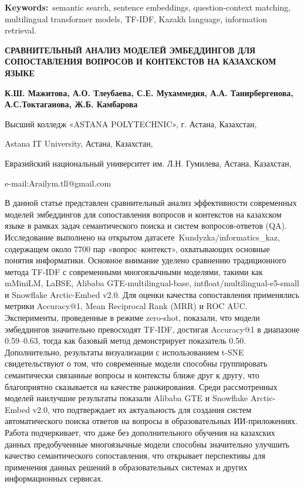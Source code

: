 {\bfseries Keywords:}~semantic search, sentence embeddings,
question-context matching, multilingual transformer models, TF-IDF,
Kazakh language, information retrieval.

\begin{header}
{\bfseries СРАВНИТЕЛЬНЫЙ АНАЛИЗ МОДЕЛЕЙ ЭМБЕДДИНГОВ ДЛЯ СОПОСТАВЛЕНИЯ ВОПРОСОВ И КОНТЕКСТОВ НА КАЗАХСКОМ ЯЗЫКЕ}

{\bfseries
{}К.Ш. Мажитова\envelope,
А.О. Тлеубаева,
С.Е. Мухаммедия,
А.А. Танирбергенова,
А.С.Токтаганова,
Ж.Б. Камбарова
}
\end{header}

\begin{affil}
Высший колледж «ASTANA POLYTECHNIC», г. Астана, Казахстан,

Astana IT University, Астана, Казахстан,

Евразийский национальный университет им. Л.Н. Гумилева, Астана, Казахстан,

e-mail:Arailym.tll@gmail.com
\end{affil}

В данной статье представлен сравнительный анализ эффективности
современных моделей эмбеддингов для сопоставления вопросов и контекстов
на казахском языке в рамках задач семантического поиска и систем
вопросов-ответов (QA). Исследование выполнено на открытом
датасете~Kundyzka/informatics\_kaz, содержащем около 7700 пар
«вопрос--контекст», охватывающих основные понятия информатики. Основное
внимание уделено сравнению традиционного метода TF-IDF с современными
многоязычными моделями, такими как mMiniLM, LaBSE, Alibaba
GTE-multilingual-base, intfloat/multilingual-e5-small и Snowflake
Arctic-Embed v2.0. Для оценки качества сопоставления применялись метрики
Accuracy@1, Mean Reciprocal Rank (MRR) и ROC AUC. Эксперименты,
проведенные в режиме zero-shot, показали, что модели эмбеддингов
значительно превосходят TF-IDF, достигая Accuracy@1 в диапазоне
0.59--0.63, тогда как базовый метод демонстрирует показатель 0.50.
Дополнительно, результаты визуализации с использованием t-SNE
свидетельствуют о том, что современные модели способны группировать
семантически связанные вопросы и контексты ближе друг к другу, что
благоприятно сказывается на качестве ранжирования. Среди рассмотренных
моделей наилучшие результаты показали Alibaba GTE и Snowflake
Arctic-Embed v2.0, что подтверждает их актуальность для создания систем
автоматического поиска ответов на вопросы в образовательных
ИИ-приложениях. Работа подчеркивает, что даже без дополнительного
обучения на казахских данных предобученные многоязычные модели способны
значительно улучшить качество семантического сопоставления, что
открывает перспективы для применения данных решений в образовательных
системах и других информационных сервисах.

